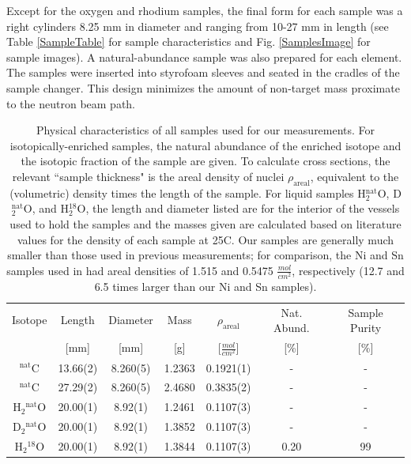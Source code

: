 Except for the oxygen and rhodium samples, the final form for each sample was a right
cylinders 8.25 mm in diameter and ranging from 10-27 mm in length (see
Table \ref{SampleTable} for sample characteristics and Fig. \ref{SamplesImage}
for sample images). A natural-abundance sample
was also prepared for each element. The samples
were inserted into styrofoam sleeves and seated in the cradles of the sample
changer. This design minimizes the amount of non-target mass proximate to the
neutron beam path.

\begin{table}[ht]
    \caption{
        Physical characteristics of all samples used for our \tots
        measurements. For isotopically-enriched samples, the natural abundance
        of the enriched isotope and the isotopic fraction of the sample are
        given. To calculate cross sections, the relevant ``sample thickness" is the areal
        density of nuclei $\rho_{\text{areal}}$, equivalent to
        the (volumetric) density times the length of the sample. For liquid
        samples H$_{2}^{\text{nat}}$O, D$_{2}^{\text{nat}}$O, and H$_{2}^{18}$O,
        the length and diameter listed are for the interior of the vessels
        used to hold the samples and the masses given are calculated based on 
        literature values for the density of each sample at 25\textdegree{}C.
        Our samples are generally much smaller than those used in previous
        measurements; for comparison, the Ni and Sn samples used in \cite{Abfalterer2001,
        Finlay1993} had areal densities of 1.515 and 0.5475
        $\frac{mol}{cm^{2}}$, respectively (12.7 and 6.5 times larger than our
    Ni and Sn samples).}
    \label{SampleCharacteristics}
    \begin{center}
        \begin{tabular}{ c c c c c c c }
            \hline
            Isotope & Length & Diameter
            & Mass & $\rho_{\text{areal}}$ & Nat. Abund. & Sample Purity\\
                 & [mm] & [mm] & [g] & [$\frac{mol}{cm^{2}}$] & [\%] & [\%]\\
            \hline

            $^{\text{nat}}$C & 13.66(2) & 8.260(5) & 1.2363
            & 0.1921(1) & - & -\\
            $^{\text{nat}}$C & 27.29(2) & 8.260(5) & 2.4680
            & 0.3835(2) & - & -\\

            H$_{2}$$^{\text{nat}}$O & 20.00(1) & 8.92(1) & 1.2461 & 0.1107(3) & - &
            - \\
            D$_{2}$$^{\text{nat}}$O & 20.00(1) & 8.92(1) & 1.3852 & 0.1107(3) & - &
            - \\
            H$_{2}$$^{18}$O & 20.00(1) & 8.92(1) & 1.3844 & 0.1107(3) & 0.20 & 99\\


\end{tabular}
\end{center}
\end{table}
